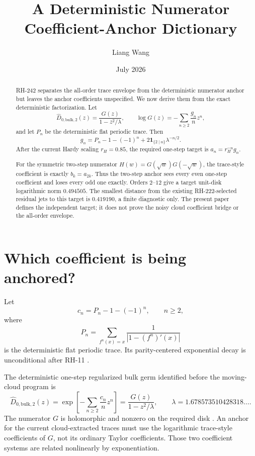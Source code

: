 \documentclass[11pt]{article}
\title{A Deterministic Numerator Coefficient-Anchor Dictionary}
\author{Liang Wang}
\date{July 2026}
\theoremstyle{remark}
\begin{document}
\maketitle

\begin{abstract}
RH-242 separates the all-order trace envelope from the deterministic
numerator anchor but leaves the anchor coefficients unspecified.  We now
derive them from the exact deterministic factorization.  Let
\[
 \widehat D_{0,\mathrm{bulk},2}(z)
 =\frac{G(z)}{1-z^2/\lambda},
 \qquad
 \log G(z)=-\sum_{n\ge2}\frac{g_n}{n}z^n,
\]
and let $P_n$ be the deterministic flat periodic trace.  Then
\[
 g_n=P_n-1-(-1)^n+2\mathbf{1}_{\{2\mid n\}}\lambda^{-n/2}.
\]
After the current Hardy scaling $r_H=0.85$, the required one-step target is
$a_n=r_H^{-n}g_n$.

For the symmetric two-step numerator
$H(w)=G(\sqrt w)G(-\sqrt w)$, the trace-style coefficient is exactly
$b_k=a_{2k}$.  Thus the two-step anchor sees every even one-step coefficient
and loses every odd one exactly.  Orders $2$--$12$ give a target unit-disk
logarithmic norm $0.494505$.  The smallest distance from the existing
RH-222-selected residual jets to this target is $0.419190$, a finite
diagnostic only.  The present paper defines the independent target; it does
not prove the noisy cloud coefficient bridge or the all-order envelope.
\end{abstract}

\section{Which coefficient is being anchored?}

Let
\begin{equation}\label{eq:centered}
 c_n=P_n-1-(-1)^n,
 \qquad n\ge2,
\end{equation}
where
\[
 P_n=\sum_{f^n(x)=x}\frac{1}{|1-(f^n)'(x)|}
\]
is the deterministic flat periodic trace.  Its parity-centered exponential
decay is unconditional after RH-11 \citep{WangRH10,WangRH11}.

The deterministic one-step regularized bulk germ identified before the
moving-cloud program is
\begin{equation}\label{eq:factor}
 \widehat D_{0,\mathrm{bulk},2}(z)
 =\exp\left[-\sum_{n\ge2}\frac{c_n}{n}z^n\right]
 =\frac{G(z)}{1-z^2/\lambda},
 \qquad \lambda=1.678573510428318\ldots .
\end{equation}
The numerator $G$ is holomorphic and nonzero on the required disk
\citep{WangRH46}.  An anchor for the current cloud-extracted traces must use
the logarithmic trace-style coefficients of $G$, not its ordinary Taylor
coefficients.  Those two coefficient systems are related nonlinearly by
exponentiation.
\end{document}
